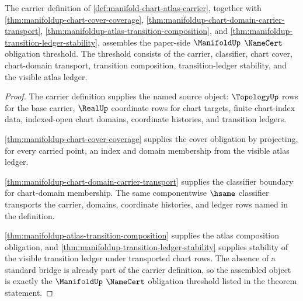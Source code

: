 \begin{theorem}
\label{thm:manifoldup-namecert-obligation-threshold}
The carrier definition of
\autoref{def:manifold-chart-atlas-carrier}, together with
\autoref{thm:manifoldup-chart-cover-coverage},
\autoref{thm:manifoldup-chart-domain-carrier-transport},
\autoref{thm:manifoldup-atlas-transition-composition}, and
\autoref{thm:manifoldup-transition-ledger-stability}, assembles the paper-side
$\ManifoldUp$ $\NameCert$ obligation threshold. The threshold consists of the
carrier, classifier, chart cover, chart-domain transport, transition
composition, transition-ledger stability, and the visible atlas ledger.
\end{theorem}
\begin{proof}
The carrier definition supplies the named source object:
$\TopologyUp$ rows for the base carrier, $\RealUp$ coordinate rows for chart
targets, finite chart-index data, indexed-open chart domains, coordinate
histories, and transition ledgers.

\autoref{thm:manifoldup-chart-cover-coverage} supplies the cover obligation by
projecting, for every carried point, an index and domain membership from the
visible atlas ledger.

\autoref{thm:manifoldup-chart-domain-carrier-transport} supplies the
classifier boundary for chart-domain membership. The same componentwise
$\hsame$ classifier transports the carrier, domains, coordinate histories, and
ledger rows named in the definition.

\autoref{thm:manifoldup-atlas-transition-composition} supplies the atlas
composition obligation, and
\autoref{thm:manifoldup-transition-ledger-stability} supplies stability of the
visible transition ledger under transported chart rows. The absence of a
standard bridge is already part of the carrier definition, so the assembled
object is exactly the $\ManifoldUp$ $\NameCert$ obligation threshold listed in
the theorem statement.
\end{proof}

